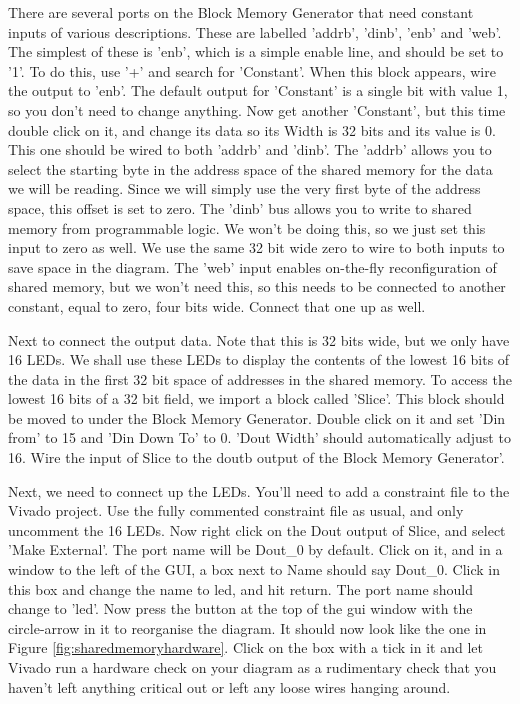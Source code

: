 \documentclass[../physical_computing.tex]{subfiles}
\begin{document}
There are several ports on the Block Memory Generator that need constant inputs of various descriptions. 
These are labelled 'addrb', 'dinb', 'enb' and 'web'. The simplest of these is 'enb', which is  a simple
enable line, and should be set to '1'. To do this, use '+' and search for 'Constant'. When this block 
appears, wire the output to 'enb'. The default output for 'Constant' is a single bit with value 1, so you
don't need to change anything. Now get another 'Constant', but this time double click on it, and change
its data so its Width is 32 bits and its value is 0. This one should be wired to both 'addrb' and 'dinb'. 
The 'addrb' allows you to select the starting byte in the address space of the shared memory for the data
we will be reading. Since we will simply use the very first byte of the address space, this offset is set
to zero. The 'dinb' bus allows you to write to shared memory from programmable logic. We won't be doing 
this, so we just set this input to zero as well. We use the same 32 bit wide zero to wire to both inputs
to save space in the diagram. The 'web' input enables on-the-fly reconfiguration of shared memory, but we
won't need this, so this needs to be connected to another constant, equal to zero, four bits wide. Connect
that one up as well. 

Next to connect the output data. Note that this is 32 bits wide, but we only have 16 LEDs. We shall use these
LEDs to display the contents of the lowest 16 bits of the data in the first 32 bit space of addresses in the 
shared memory. To access the lowest 16 bits of a 32 bit field, we import a block called 'Slice'. This block
should be moved to under the Block Memory Generator. Double click on it and set 'Din from' to 15 and 'Din Down To'
to 0. 'Dout Width' should automatically adjust to 16. Wire the input of Slice to the doutb output of the Block
Memory Generator'. 

Next, we need to connect up the LEDs. You'll need to add a constraint file to the Vivado project. Use the 
fully commented constraint file as usual, and only uncomment the 16 LEDs. Now right click on the Dout output of
Slice, and select 'Make External'. The port name will be Dout\_0 by default. Click on it, and in a window to the left
of the GUI, a box next to Name should say Dout\_0. Click in this box and change the name to led, and hit return. 
The port name should change to 'led'. Now press the button at the top of the gui window with the circle-arrow in 
it to reorganise the diagram. It should now look like the one in Figure \ref{fig:sharedmemoryhardware}. Click on the 
box with a tick in it and let Vivado run a hardware check on your diagram as a rudimentary check that you haven't  
left anything critical out or left any loose wires hanging around.
\end{document}

